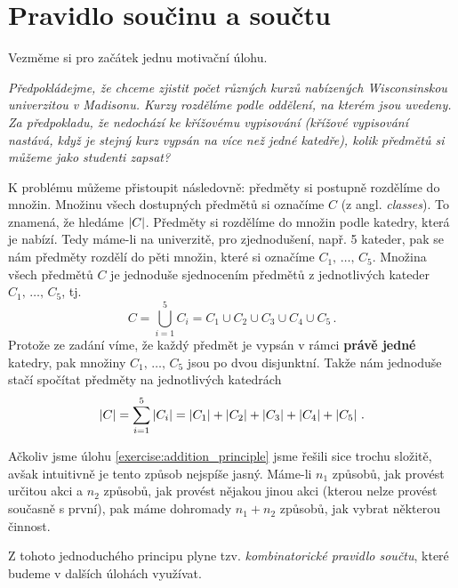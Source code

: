 \section{Pravidlo součinu a součtu}

Vezměme si pro začátek jednu motivační úlohu.

\begin{exercise}
    \textit{Předpokládejme, že chceme zjistit počet různých kurzů nabízených Wisconsinskou univerzitou v Madisonu. Kurzy rozdělíme podle oddělení, na kterém jsou uvedeny. Za předpokladu, že nedochází ke křížovému vypisování (křížové vypisování nastává, když je stejný kurz vypsán na více než jedné katedře), kolik předmětů si můžeme jako studenti zapsat?} \citep[str. 28]{Brualdi2018}
\end{exercise}

\begin{solution}\label{exercise:addition_principle}
    K problému můžeme přistoupit následovně: předměty si postupně rozdělíme do množin. Množinu všech dostupných předmětů si označíme $C$ (z angl. \emph{classes}). To znamená, že hledáme $\left| C \right|$. Předměty si rozdělíme do množin podle katedry, která je nabízí. Tedy máme-li na univerzitě, pro zjednodušení, např. 5 kateder, pak se nám předměty rozdělí do pěti množin, které si označíme $C_1,\,\dots,\, C_5$. Množina všech předmětů $C$ je jednoduše sjednocením předmětů z jednotlivých kateder $C_1,\,\dots,\, C_5$, tj.
    \begin{equation*}
        C=\bigcup\limits_{i=1}^{5}C_i=C_1\cup C_2\cup C_3\cup C_4\cup C_5\,.
    \end{equation*}
    Protože ze zadání víme, že každý předmět je vypsán v rámci \textbf{právě jedné} katedry, pak množiny $C_1,\,\dots,\, C_5$ jsou po dvou disjunktní. Takže nám jednoduše stačí spočítat předměty na jednotlivých katedrách
    \begin{equation*}
        \left| C \right|=\sum_{i=1}^{5}\left| C_i \right|=\left| C_1 \right|+\left| C_2 \right|+\left| C_3 \right|+\left| C_4 \right|+\left| C_5 \right|\,.
    \end{equation*}
\end{solution}

Ačkoliv jsme úlohu \ref{exercise:addition_principle} jsme řešili sice trochu složitě, avšak intuitivně je tento způsob nejspíše jasný. Máme-li $n_1$ způsobů, jak provést určitou akci a $n_2$ způsobů, jak provést nějakou jinou akci (kterou nelze provést současně s první), pak máme dohromady $n_1+n_2$ způsobů, jak vybrat některou činnost.\par
Z tohoto jednoduchého principu plyne tzv. \emph{kombinatorické pravidlo součtu}, které budeme v dalších úlohách využívat.

